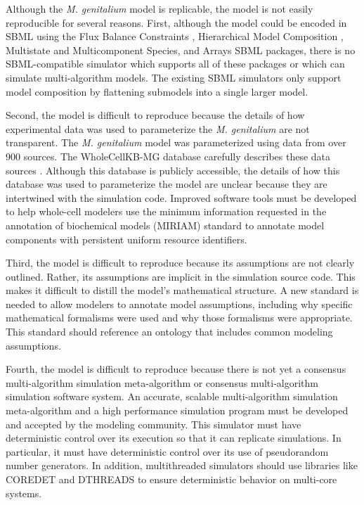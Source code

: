 \documentclass[journal,transmag,twoside]{IEEEtran}
\begin{document}
Although the \textit{M. genitalium} model is replicable, the model is not easily reproducible for several reasons. First,
although the model could be encoded in SBML using the Flux Balance Constraints \cite{olivier2015fbc}, Hierarchical Model Composition \cite{smith2015sbml}, Multistate and Multicomponent
Species, and Arrays \cite{watanabe2016efficient} SBML packages, there is no SBML-compatible simulator which supports all of these packages or
which can simulate multi-algorithm models. The existing SBML simulators only support 
model composition by flattening submodels into a single larger model. 

Second, the model is difficult to reproduce because the details of how experimental data was used to parameterize the \textit{M. genitalium}
are not transparent. The \textit{M. genitalium} model was parameterized using data from over 900 
sources. The WholeCellKB-MG database carefully describes these data sources \cite{karr2013wholecellkb}. Although this database is publicly accessible, 
the details of how this database was used to parameterize the model are unclear
because they are intertwined with the simulation code. 
Improved software tools must be developed to help whole-cell modelers use the minimum information 
requested in the annotation of biochemical models (MIRIAM) \cite{novere2005minimum}
standard to annotate model components with persistent uniform resource identifiers. 

Third, the model is difficult to reproduce because its assumptions are not clearly outlined. Rather, its assumptions are
implicit in the simulation source code. This makes it difficult
to distill the model's mathematical structure. A new standard is needed to allow modelers to annotate model assumptions, including why
specific mathematical formalisms were used and why those formalisms were appropriate. This standard should reference an ontology that 
includes common modeling assumptions.

Fourth, the model is difficult to reproduce because there is not yet a consensus multi-algorithm simulation meta-algorithm 
or consensus multi-algorithm simulation software system. An accurate, scalable multi-algorithm simulation meta-algorithm
and a high performance simulation program must be developed and accepted by the modeling community. This 
simulator must have deterministic control over its execution so that it can replicate 
simulations. In particular, it must have deterministic control over its use of pseudorandom number generators. 
In addition, multithreaded simulators should use libraries like C{\small ORE}D{\small ET} and D{\small THREADS} to 
ensure deterministic behavior on multi-core systems.
\end{document}
